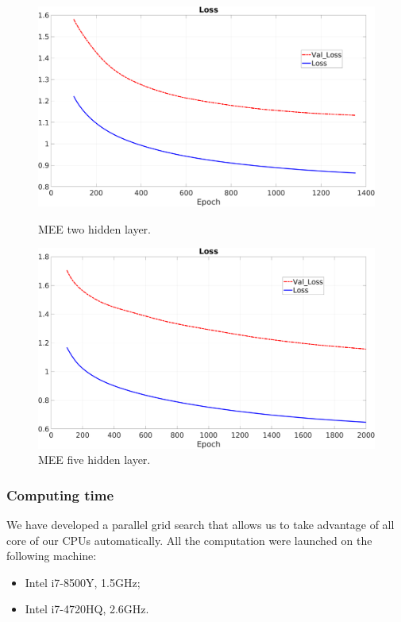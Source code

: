 \vspace{0.5cm}
\begin{figure}[H]
	\centering
	\begin{minipage}[t]{0.5\linewidth}
		\includegraphics[width=\linewidth]{img/Cup_loss_Reg_Zoom_2l.png}
		\caption{MEE two hidden layer.}
		\label{img::twolayer}
	\end{minipage}%
	\begin{minipage}[t]{0.5\linewidth}
		\includegraphics[width=\linewidth]{img/Cup_loss_Reg_Zoom_5l.png}
		\caption{MEE five hidden layer.}
		\label{img::fivelayer}
	\end{minipage}
\end{figure}

\subsubsection{Computing time}
We have developed a parallel grid search that allows us to take advantage of all core of our CPUs automatically. All the computation were launched on the following machine:
\begin{itemize}
	\item Intel i7-8500Y, 1.5GHz;
	\item Intel i7-4720HQ, 2.6GHz.
	
\end{itemize}

